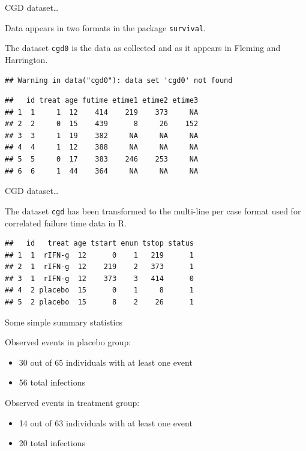 \documentclass[ignorenonframetext,]{beamer}
\begin{document}
\begin{frame}[fragile]{%
\protect\hypertarget{cgd-dataset-1}{%
CGD dataset\ldots}}

Data appears in two formats in the package \texttt{survival}.

The dataset \texttt{cgd0} is the data as collected and as it appears in
Fleming and Harrington.

\footnotesize

\begin{verbatim}
## Warning in data("cgd0"): data set 'cgd0' not found
\end{verbatim}

\begin{verbatim}
##   id treat age futime etime1 etime2 etime3
## 1  1     1  12    414    219    373     NA
## 2  2     0  15    439      8     26    152
## 3  3     1  19    382     NA     NA     NA
## 4  4     1  12    388     NA     NA     NA
## 5  5     0  17    383    246    253     NA
## 6  6     1  44    364     NA     NA     NA
\end{verbatim}

\end{frame}

\begin{frame}[fragile]{%
\protect\hypertarget{cgd-dataset-2}{%
CGD dataset\ldots}}

The dataset \texttt{cgd} has been transformed to the multi-line per case
format used for correlated failure time data in \textsf{R}.

\footnotesize

\begin{verbatim}
##   id   treat age tstart enum tstop status
## 1  1  rIFN-g  12      0    1   219      1
## 2  1  rIFN-g  12    219    2   373      1
## 3  1  rIFN-g  12    373    3   414      0
## 4  2 placebo  15      0    1     8      1
## 5  2 placebo  15      8    2    26      1
\end{verbatim}

\end{frame}

\begin{frame}{%
\protect\hypertarget{some-simple-summary-statistics}{%
Some simple summary statistics}}

Observed events in placebo group:

\begin{itemize}
\item
  30 out of 65 individuals with at least one event
\item
  56 total infections
\end{itemize}

Observed events in treatment group:

\begin{itemize}
\item
  14 out of 63 individuals with at least one event
\item
  20 total infections
\end{itemize}

\end{frame}
\end{document}
